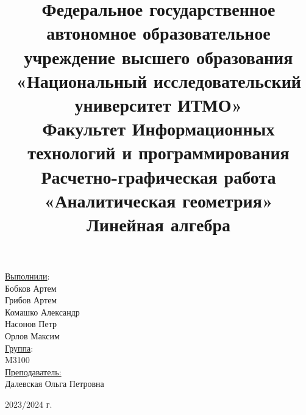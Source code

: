 \title{Федеральное государственное автономное образовательное учреждение высшего образования\\
«Национальный исследовательский университет ИТМО»\\
Факультет Информационных технологий и программирования\\[2\baselineskip]
Расчетно-графическая работа\\
\textbf{«Аналитическая геометрия»}\\
Линейная алгебра\\
}
\date{}
\author{}

\maketitle

\thispagestyle{empty}
\vfill
\begin{flushright}
  \begin{large}
\underline{Выполнили}:\\
Бобков Артем\\
Грибов Артем\\
Комашко Александр\\
Насонов Петр\\
Орлов Максим\\[1\baselineskip]

\underline{Группа}:\\
M3100\\[1\baselineskip]
\underline{Преподаватель:}\\
Далевская Ольга Петровна\\[3\baselineskip]

\end{large}

\end{flushright}
\begin{center} \begin{normalsize} 2023/2024 г. \\\end{normalsize} \end{center}

\clearpage

\pagestyle{plain}

